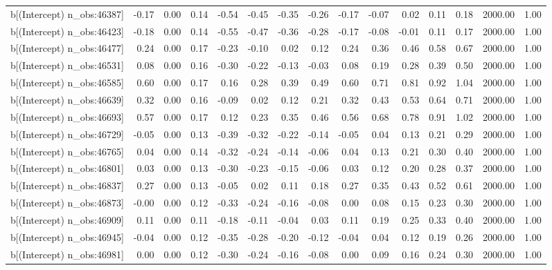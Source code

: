 \begin{table}[ht]
\begin{tabular}{rrrrrrrrrrrrrrr}
  b[(Intercept) n\_obs:46387] & -0.17 & 0.00 & 0.14 & -0.54 & -0.45 & -0.35 & -0.26 & -0.17 & -0.07 & 0.02 & 0.11 & 0.18 & 2000.00 & 1.00 \\ 
  b[(Intercept) n\_obs:46423] & -0.18 & 0.00 & 0.14 & -0.55 & -0.47 & -0.36 & -0.28 & -0.17 & -0.08 & -0.01 & 0.11 & 0.17 & 2000.00 & 1.00 \\ 
  b[(Intercept) n\_obs:46477] & 0.24 & 0.00 & 0.17 & -0.23 & -0.10 & 0.02 & 0.12 & 0.24 & 0.36 & 0.46 & 0.58 & 0.67 & 2000.00 & 1.00 \\ 
  b[(Intercept) n\_obs:46531] & 0.08 & 0.00 & 0.16 & -0.30 & -0.22 & -0.13 & -0.03 & 0.08 & 0.19 & 0.28 & 0.39 & 0.50 & 2000.00 & 1.00 \\ 
  b[(Intercept) n\_obs:46585] & 0.60 & 0.00 & 0.17 & 0.16 & 0.28 & 0.39 & 0.49 & 0.60 & 0.71 & 0.81 & 0.92 & 1.04 & 2000.00 & 1.00 \\ 
  b[(Intercept) n\_obs:46639] & 0.32 & 0.00 & 0.16 & -0.09 & 0.02 & 0.12 & 0.21 & 0.32 & 0.43 & 0.53 & 0.64 & 0.71 & 2000.00 & 1.00 \\ 
  b[(Intercept) n\_obs:46693] & 0.57 & 0.00 & 0.17 & 0.12 & 0.23 & 0.35 & 0.46 & 0.56 & 0.68 & 0.78 & 0.91 & 1.02 & 2000.00 & 1.00 \\ 
  b[(Intercept) n\_obs:46729] & -0.05 & 0.00 & 0.13 & -0.39 & -0.32 & -0.22 & -0.14 & -0.05 & 0.04 & 0.13 & 0.21 & 0.29 & 2000.00 & 1.00 \\ 
  b[(Intercept) n\_obs:46765] & 0.04 & 0.00 & 0.14 & -0.32 & -0.24 & -0.14 & -0.06 & 0.04 & 0.13 & 0.21 & 0.30 & 0.40 & 2000.00 & 1.00 \\ 
  b[(Intercept) n\_obs:46801] & 0.03 & 0.00 & 0.13 & -0.30 & -0.23 & -0.15 & -0.06 & 0.03 & 0.12 & 0.20 & 0.28 & 0.37 & 2000.00 & 1.00 \\ 
  b[(Intercept) n\_obs:46837] & 0.27 & 0.00 & 0.13 & -0.05 & 0.02 & 0.11 & 0.18 & 0.27 & 0.35 & 0.43 & 0.52 & 0.61 & 2000.00 & 1.00 \\ 
  b[(Intercept) n\_obs:46873] & -0.00 & 0.00 & 0.12 & -0.33 & -0.24 & -0.16 & -0.08 & 0.00 & 0.08 & 0.15 & 0.23 & 0.30 & 2000.00 & 1.00 \\ 
  b[(Intercept) n\_obs:46909] & 0.11 & 0.00 & 0.11 & -0.18 & -0.11 & -0.04 & 0.03 & 0.11 & 0.19 & 0.25 & 0.33 & 0.40 & 2000.00 & 1.00 \\ 
  b[(Intercept) n\_obs:46945] & -0.04 & 0.00 & 0.12 & -0.35 & -0.28 & -0.20 & -0.12 & -0.04 & 0.04 & 0.12 & 0.19 & 0.26 & 2000.00 & 1.00 \\ 
  b[(Intercept) n\_obs:46981] & 0.00 & 0.00 & 0.12 & -0.30 & -0.24 & -0.16 & -0.08 & 0.00 & 0.09 & 0.16 & 0.24 & 0.30 & 2000.00 & 1.00 \\ 

\end{tabular}
\end{table}
